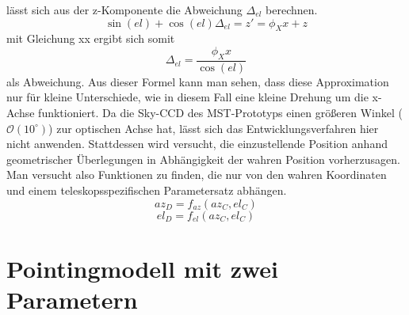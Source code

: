 lässt sich aus der z-Komponente die Abweichung $\Delta_{el}$ berechnen.
\begin{equation}
\sin(el)+\cos(el)\Delta_{el}=z\prime=\phi_Xx+z
\end{equation}
mit Gleichung xx ergibt sich somit 
\begin{equation}
\Delta_{el}=\frac{\phi_Xx}{\cos(el)}
\end{equation}
als Abweichung. Aus dieser Formel kann man sehen, dass diese Approximation nur für kleine Unterschiede, wie in diesem Fall eine kleine Drehung um die x-Achse funktioniert.
Da die Sky-CCD des MST-Prototyps einen größeren Winkel ($\mathcal{O}\left(10^{\circ}\right)$) zur optischen Achse hat, lässt sich das Entwicklungsverfahren hier nicht anwenden. Stattdessen wird versucht, die einzustellende Position anhand geometrischer Überlegungen in Abhängigkeit der wahren Position vorherzusagen. Man versucht also Funktionen zu finden, die nur von den wahren Koordinaten und einem teleskopsspezifischen Parametersatz abhängen.
\begin{equation} 
az_D=f_{az}(az_C,el_C)
\end{equation}
\begin{equation}
el_D=f_{el}(az_C,el_C)
\label{eq:pointingprinciple}
\end{equation}

\section{Pointingmodell mit zwei Parametern}
